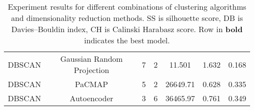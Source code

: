 \begin{table}[hbt]
{\begin{tabular}{|c|c|c|c|c|c|c|}
        DBSCAN                   & Gaussian Random Projection     &  7      & 2    & 11.501 & 1.632  & 0.168\\
        DBSCAN                   & PaCMAP     &  5      & 2    & 26649.71  & 0.628  & 0.335\\
        DBSCAN                   & Autoencoder     &  3      & 6    & 36465.97  & 0.761  & 0.349\\
    \bottomrule
    \end{tabular}%
    }
    \caption{Experiment results for different combinations of clustering algorithms and dimensionality reduction methods. SS is silhouette score, DB is Davies–Bouldin index, CH is Calinski Harabasz score. Row in \textbf{bold} indicates the best model.}
    \label{tab:results}
\end{table} 